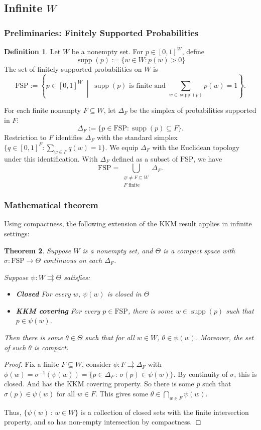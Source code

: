 \documentclass[11pt]{article}
\newtheorem{theorem}{Theorem}[section]
\theoremstyle{definition}
\newtheorem{definition}[theorem]{Definition}
\theoremstyle{remark}
\newcommand{\supp}{\operatorname{supp}}
\newcommand{\given}{\,:\,}
\newcommand{\FSP}{\mathrm{FSP}}
\begin{document}
\subsection{Infinite $W$}


\subsubsection{Preliminaries: Finitely Supported Probabilities}
\begin{definition}
Let $W$ be a nonempty set. For $p\in[0,1]^W$, define
$$\operatorname{supp}(p):=\{w\in W:p(w)>0\}$$ The set of finitely
supported probabilities on $W$ is
\[
\mathrm{FSP}
:= \left\{p\in[0,1]^W \;\middle|\;
\operatorname{supp}(p)\text{ is finite and }
\sum_{w\in\operatorname{supp}(p)}p(w)=1
\right\}.
\]

For each finite nonempty $F\subseteq W$, let $\Delta_F$ be the simplex
of probabilities supported in $F$:
\[
\Delta_F
:= \{p\in\mathrm{FSP}:\operatorname{supp}(p)\subseteq F\}.
\]
Restriction to $F$ identifies $\Delta_F$ with the standard simplex
$\{q\in[0,1]^F:\sum_{w\in F}q(w)=1\}$. We equip $\Delta_F$ with
the Euclidean topology under this identification. With $\Delta_F$
defined as a subset of $\mathrm{FSP}$, we have
\[
\mathrm{FSP}
= \bigcup_{\substack{\varnothing\ne F\subseteq W\\ F\text{ finite}}}
\Delta_F.
\]
\end{definition}

\subsubsection{Mathematical theorem}

Using compactness, the following extension of the KKM result applies in infinite settings:
\begin{theorem}
	Suppose $W$ is a nonempty set, and $\Theta$ is a compact space with $\sigma:\FSP\to \Theta$ continuous on each $\Delta_F$. 
	
	Suppose $\psi:W\rightrightarrows \Theta$ satisfies:\begin{itemize}
		\item \textbf{Closed} For every $w$, $\psi(w)$ is closed in $\Theta$
		\item \textbf{KKM covering} For every $p\in \FSP$, there is some $w\in\supp(p)$ such that $p\in\psi(w)$.
	\end{itemize}
	Then there is some $\theta\in\Theta$ such that for all $w\in W$, $\theta\in\psi(w)$. Moreover, the set of such $\theta$ is compact.
\end{theorem}
\begin{proof}
	Fix a finite $F\subseteq W$, consider $\phi:F\rightrightarrows \Delta_F$ with $\phi(w)=\sigma^{-1}(\psi(w))=\{p\in\Delta_F\given \sigma(p)\in\psi(w)\}$. By continuity of $\sigma$, this is closed. And has the KKM covering property.  So there is some $p$ such that $\sigma(p)\in\psi(w)$ for all $w\in F$. This gives some $\theta\in \bigcap_{w\in F}\psi(w)$. 
	
	Thus, $\{\psi(w)\given w\in W\}$ is a collection of closed sets with the finite intersection property, and so has non-empty intersection by compactness. 
\end{proof}
\end{document}
